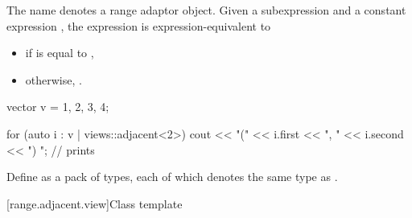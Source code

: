 \pnum
{}%
The name  denotes
a range adaptor object.
Given a subexpression  and a constant expression ,
the expression  is expression-equivalent to
\begin{itemize}
\item
{}
if  is equal to ,
\item
otherwise, .
\end{itemize}

\begin{example}
\begin{codeblock}
vector v = {1, 2, 3, 4};

for (auto i : v | views::adjacent<2>) {
  cout << "(" << i.first << ", " << i.second << ") ";   // prints 
}
\end{codeblock}
\end{example}

\pnum
Define  as a pack of  types,
each of which denotes the same type as .

[range.adjacent.view]{Class template }

